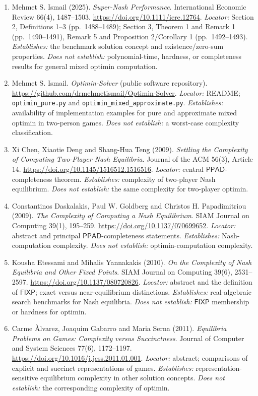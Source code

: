 \documentclass[11pt,a4paper]{article}
\begin{document}
\begin{enumerate}
\item[S1] Mehmet S. Ismail (2025). \emph{Super-Nash Performance}. International Economic Review 66(4), 1487--1503. \url{https://doi.org/10.1111/iere.12764}. \textit{Locator:} Section 2, Definitions 1--3 (pp.~1488--1489); Section 3, Theorem 1 and Remark 1 (pp.~1490--1491), Remark 5 and Proposition 2/Corollary 1 (pp.~1492--1493). \textit{Establishes:} the benchmark solution concept and existence/zero-sum properties. \textit{Does not establish:} polynomial-time, hardness, or completeness results for general mixed optimin computation.

\item[S2] Mehmet S. Ismail. \emph{Optimin-Solver} (public software repository). \url{https://github.com/drmehmetismail/Optimin-Solver}. \textit{Locator:} README; \texttt{optimin\_pure.py} and \texttt{optimin\_mixed\_approximate.py}. \textit{Establishes:} availability of implementation examples for pure and approximate mixed optimin in two-person games. \textit{Does not establish:} a worst-case complexity classification.

\item[S3] Xi Chen, Xiaotie Deng and Shang-Hua Teng (2009). \emph{Settling the Complexity of Computing Two-Player Nash Equilibria}. Journal of the ACM 56(3), Article 14. \url{https://doi.org/10.1145/1516512.1516516}. \textit{Locator:} central $\mathsf{PPAD}$-completeness theorem. \textit{Establishes:} complexity of two-player Nash equilibrium. \textit{Does not establish:} the same complexity for two-player optimin.

\item[S4] Constantinos Daskalakis, Paul W. Goldberg and Christos H. Papadimitriou (2009). \emph{The Complexity of Computing a Nash Equilibrium}. SIAM Journal on Computing 39(1), 195--259. \url{https://doi.org/10.1137/070699652}. \textit{Locator:} abstract and principal $\mathsf{PPAD}$-completeness statements. \textit{Establishes:} Nash-computation complexity. \textit{Does not establish:} optimin-computation complexity.

\item[S5] Kousha Etessami and Mihalis Yannakakis (2010). \emph{On the Complexity of Nash Equilibria and Other Fixed Points}. SIAM Journal on Computing 39(6), 2531--2597. \url{https://doi.org/10.1137/080720826}. \textit{Locator:} abstract and the definition of $\mathsf{FIXP}$; exact versus near-equilibrium distinctions. \textit{Establishes:} real-algebraic search benchmarks for Nash equilibria. \textit{Does not establish:} $\mathsf{FIXP}$ membership or hardness for optimin.

\item[S6] Carme \`Alvarez, Joaquim Gabarro and Maria Serna (2011). \emph{Equilibria Problems on Games: Complexity versus Succinctness}. Journal of Computer and System Sciences 77(6), 1172--1197. \url{https://doi.org/10.1016/j.jcss.2011.01.001}. \textit{Locator:} abstract; comparisons of explicit and succinct representations of games. \textit{Establishes:} representation-sensitive equilibrium complexity in other solution concepts. \textit{Does not establish:} the corresponding complexity of optimin.
\end{enumerate}
\end{document}
